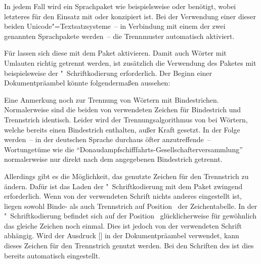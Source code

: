 In jedem Fall wird ein Sprachpaket wie beispielsweise  oder
 benötigt, wobei letzteres für den Einsatz mit
 oder  konzipiert ist. Bei der Verwendung
einer dieser beiden Unicode"=Textsatzsysteme~-- in Verbindung mit einem der zwei
genannten Sprachpakete werden~-- die Trennmuster automatisch aktiviert. 

Für  lassen sich diese mit dem Paket 
aktivieren. Damit auch Wörter mit Umlauten richtig getrennt werden, ist
zusätzlich die Verwendung des Paketes  mit beispielsweise der
"~Schriftkodierung erforderlich. Der Beginn einer Dokumentpräambel
könnte folgendermaßen aussehen:
%
\begin{quoting}[rightmargin=0pt]
\end{quoting}
%
Eine Anmerkung noch zur Trennung von Wörtern mit Bindestrichen. Normalerweise 
sind die beiden von  verwendeten Zeichen für Bindestrich und 
Trennstrich identisch. Leider wird der Trennungsalgorithmus von  
bei Wörtern, welche bereits einen Bindestrich enthalten, außer Kraft gesetzt. 
In der Folge werden~-- in der deutschen Sprache durchaus öfter anzutreffende~-- 
Wortungetüme wie die \enquote{Donaudampfschifffahrts-Gesellschafterversammlung} 
normalerweise nur direkt nach dem angegebenen Bindestrich getrennt. 

Allerdings gibt es die Möglichkeit, das genutzte Zeichen für den Trennstrich 
zu ändern. Dafür ist das Laden der "~Schriftkodierung mit dem Paket 
 zwingend erforderlich. Wenn von der verwendeten Schrift 
nichts anderes eingestellt ist, liegen sowohl Binde- als auch Trennstrich auf 
Position~ der Zeichentabelle. In der "~Schriftkodierung 
befindet sich auf der Position~ glücklicherweise für gewöhnlich das 
gleiche Zeichen noch einmal. Dies ist jedoch von der verwendeten Schrift 
abhängig. Wird der Ausdruck [] in der 
Dokumentpräambel verwendet, kann dieses Zeichen für den Trennstrich genutzt 
werden. Bei den Schriften des \TUDCDs ist dies bereits automatisch eingestellt.

